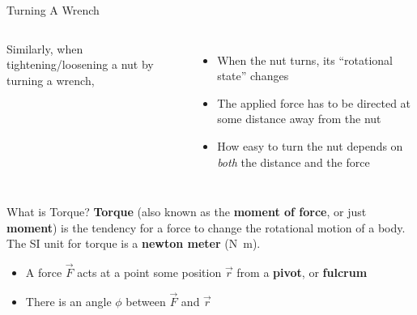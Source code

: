 \documentclass[12pt,compress,aspectratio=169]{beamer}
\begin{document}
\begin{frame}{Turning A Wrench}
  \begin{columns}
    
    Similarly, when tightening/loosening a nut by turning a wrench,
    \begin{itemize}
    \item When the nut turns, its ``rotational state'' changes
    \item The applied force has to be directed at some distance away from the
      nut
    \item How easy to turn the nut depends on \emph{both} the distance and the
      force
    \end{itemize}
  \end{columns}
\end{frame}



%    
%



\begin{frame}{What is Torque?}
  \textbf{Torque} (also known as the \textbf{moment of force}, or just
  \textbf{moment}) is the tendency for a force to change the rotational motion
  of a body. The SI unit for torque is a \textbf{newton meter}
  (\si{\newton\metre}).
  \begin{itemize}
  \item A force $\vec F$ acts at a point some position $\vec r$ from a
    \textbf{pivot}, or \textbf{fulcrum}
  \item There is an angle $\phi$ between $\vec F$ and $\vec r$
  \end{itemize}
  \begin{center}
  \end{center}
\end{frame}
\end{document}
